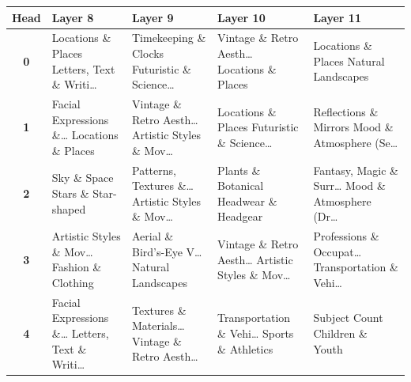 \begin{table}[ht]
\centering
\renewcommand{\arraystretch}{1.1}
\setlength{\tabcolsep}{3pt}
\scriptsize
\begin{tabularx}{\textwidth}{|c|*{4}{>{\raggedright\arraybackslash}X|}}
\hline
\textbf{Head} & \textbf{Layer 8} & \textbf{Layer 9} & \textbf{Layer 10} & \textbf{Layer 11} \\
\hline
\textbf{0} & Locations \& Places \newline Letters, Text \& Writi… & Timekeeping \& Clocks \newline Futuristic \& Science… & Vintage \& Retro Aesth… \newline Locations \& Places & Locations \& Places \newline Natural Landscapes \\
\hline
\textbf{1} & Facial Expressions \&… \newline Locations \& Places & Vintage \& Retro Aesth… \newline Artistic Styles \& Mov… & Locations \& Places \newline Futuristic \& Science… & Reflections \& Mirrors \newline Mood \& Atmosphere (Se… \\
\hline
\textbf{2} & Sky \& Space \newline Stars \& Star-shaped & Patterns, Textures \&… \newline Artistic Styles \& Mov… & Plants \& Botanical \newline Headwear \& Headgear & Fantasy, Magic \& Surr… \newline Mood \& Atmosphere (Dr… \\
\hline
\textbf{3} & Artistic Styles \& Mov… \newline Fashion \& Clothing & Aerial \& Bird's-Eye V… \newline Natural Landscapes & Vintage \& Retro Aesth… \newline Artistic Styles \& Mov… & Professions \& Occupat… \newline Transportation \& Vehi… \\
\hline
\textbf{4} & Facial Expressions \&… \newline Letters, Text \& Writi… & Textures \& Materials… \newline Vintage \& Retro Aesth… & Transportation \& Vehi… \newline Sports \& Athletics & Subject Count \newline Children \& Youth \\
\hline

\end{tabularx}
\end{table}
